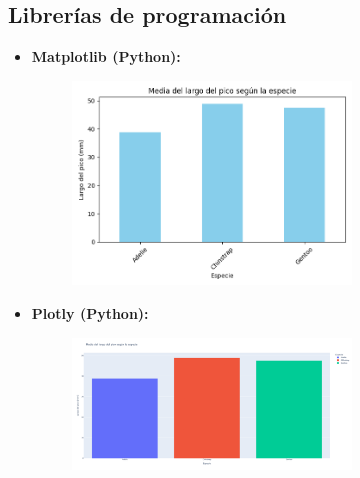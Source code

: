 \documentclass{../../miPlantilla}
\begin{document}
\subsection{Librerías de programación}
\begin{itemize}
    \item \textbf{Matplotlib (Python):}
    \begin{figure}[H]
        \centering
        \includegraphics[width=0.7\textwidth]{3.png}
    \end{figure}

    \item \textbf{Plotly (Python):}
    \begin{figure}[H]
        \centering
        \includegraphics[width=0.7\textwidth]{4.png}
    \end{figure}
\end{itemize}

\newpage
\end{document}
